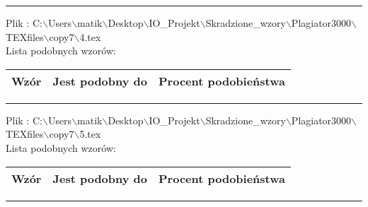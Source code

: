 \documentclass{article}
\begin{document}
\hrule
\begin{flushleft}
Plik : C:$\backslash$Users$\backslash$matik$\backslash$Desktop$\backslash$IO\_Projekt$\backslash$Skradzione\_wzory$\backslash$Plagiator3000$\backslash$TEXfiles$\backslash$copy7$\backslash$4.tex\\ 
Lista podobnych wzorów: \\ 
\begin{longtable}{|c|c|c|} 
 \hline 
 Wzór & Jest podobny do & Procent podobieństwa \\ \hline  
\end{longtable} 

\end{flushleft}
\hrule
\begin{flushleft}
Plik : C:$\backslash$Users$\backslash$matik$\backslash$Desktop$\backslash$IO\_Projekt$\backslash$Skradzione\_wzory$\backslash$Plagiator3000$\backslash$TEXfiles$\backslash$copy7$\backslash$5.tex\\ 
Lista podobnych wzorów: \\ 
\begin{longtable}{|c|c|c|} 
 \hline 
 Wzór & Jest podobny do & Procent podobieństwa \\ \hline  
\end{longtable} 

\end{flushleft}
\hrule
\end{document}
